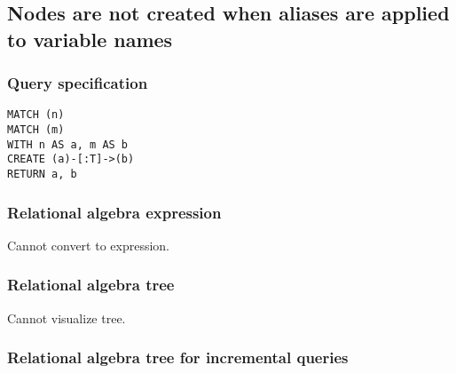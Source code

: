 
\subsection{Nodes are not created when aliases are applied to variable names}

\subsubsection*{Query specification}

\begin{lstlisting}
MATCH (n)
MATCH (m)
WITH n AS a, m AS b
CREATE (a)-[:T]->(b)
RETURN a, b
\end{lstlisting}

\subsubsection*{Relational algebra expression}

Cannot convert to expression.

\subsubsection*{Relational algebra tree}

Cannot visualize tree.

\subsubsection*{Relational algebra tree for incremental queries}

